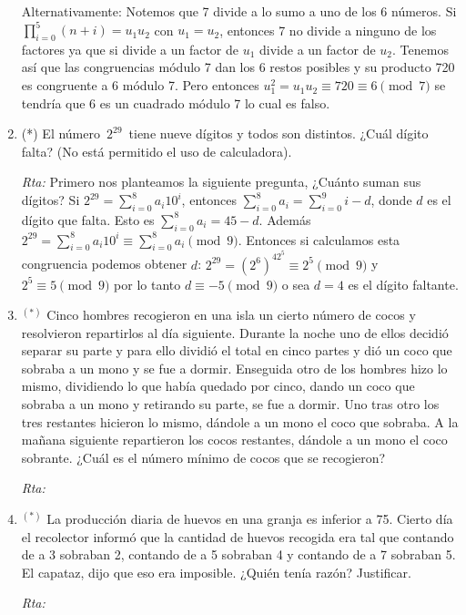 \documentclass[a4paper,12pt,twoside,spanish,reqno]{amsbook}
\numberwithin{equation}{section}
\newcommand{\rta}{\noindent\textit{Rta: }}
\begin{document}
\begin{enumerate}
    Alternativamente: Notemos que 7 divide a lo sumo a uno de los 6 números. Si $\prod_{i=0}^5(n+i)=u_1u_2$ con $u_1=u_2$, entonces 7 no divide a ninguno de los factores ya que si divide a un factor de $u_1$ divide a un factor de $u_2$. Tenemos así que las congruencias módulo 7 dan los 6 restos posibles y su producto 720 es congruente a 6 módulo 7. Pero entonces $u_1^2=u_1u_2\equiv 720\equiv 6 \pmod{7}$ se tendría que 6 es un cuadrado módulo 7 lo cual es falso.
    
    
    
    \item (*) El número \,$2^{29}$\, tiene nueve dígitos y todos son distintos.
    ¿Cuál dígito falta? (No está permitido el uso de calculadora).
    
    \rta Primero nos planteamos la siguiente pregunta, ¿Cuánto suman sus dígitos? Si $2^{29} =  \sum_{i=0}^8 a_i10^i$, entonces  $\sum_{i=0}^8 a_i= \sum_{i=0}^9i-d$, donde $d$ es el dígito que falta.
    Esto es $\sum_{i=0}^8 a_i= 45-d$. Además $2^{29} = \sum_{i=0}^8 a_i10^i \equiv \sum_{i=0}^8 a_i\pmod{9} $.     Entonces si calculamos esta congruencia podemos obtener $d$: 
    $2^{29}=(2^6)^42^5\equiv 2^5 \pmod{9}$ y $2^5\equiv 5 \pmod{9}$ por lo tanto $d\equiv -5 \pmod{9}$ o sea $d=4$ es el dígito faltante. 
    

    \item${}^{(*)}$ Cinco hombres recogieron en una isla un cierto número de cocos y resolvieron repartirlos al día siguiente. Durante la noche uno de ellos decidió separar su parte y para ello dividió el total en cinco partes y dió un coco que sobraba a un mono y se fue a dormir. Enseguida otro de los hombres hizo lo mismo, dividiendo lo que había quedado por cinco, dando un coco que sobraba a un mono y retirando su parte, se fue a dormir. Uno tras otro los tres restantes hicieron lo mismo, dándole a un mono el coco que sobraba. A la ma\~nana siguiente repartieron los cocos restantes, dándole a un mono el coco sobrante. ¿Cuál es el número mínimo de cocos que se recogieron?
    
    \rta


    \item${}^{(*)}$ La producción diaria de huevos en una granja es inferior a 75. Cierto día el recolector informó que la cantidad de huevos recogida era tal que contando de a 3 sobraban 2, contando de a 5 sobraban 4 y contando de a 7 sobraban 5. El capataz, dijo que eso era imposible. ¿Quién tenía razón? Justificar.

    \rta

\end{enumerate}
\end{document}
